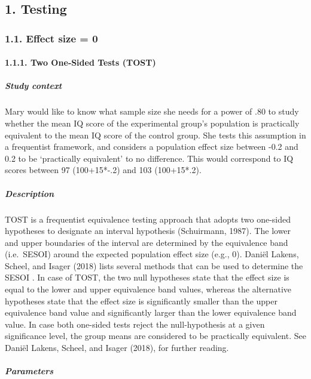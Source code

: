 \documentclass[
  english,
  man,floatsintext]{apa6}
\let\oldparagraph\paragraph
\renewcommand{\paragraph}[1]{\oldparagraph{#1}\mbox{}}
\let\oldsubparagraph\subparagraph
\renewcommand{\subparagraph}[1]{\oldsubparagraph{#1}\mbox{}}
\begin{document}
\hypertarget{testing}{%
\subsection{1. Testing}\label{testing}}

\hypertarget{effect-size-0}{%
\subsubsection{1.1. Effect size = 0}\label{effect-size-0}}

\hypertarget{two-onesided-tests-tost}{%
\paragraph{1.1.1. Two One‐Sided Tests (TOST)}\label{two-onesided-tests-tost}}

\hypertarget{study-context}{%
\subparagraph{Study context}\label{study-context}}

Mary would like to know what sample size she needs for a power of .80 to study whether the mean IQ score of the experimental group's population is practically equivalent to the mean IQ score of the control group. She tests this assumption in a frequentist framework, and considers a population effect size between -0.2 and 0.2 to be `practically equivalent' to no difference. This would correspond to IQ scores between 97 (100+15*-.2) and 103 (100+15*.2).

\hypertarget{description}{%
\subparagraph{Description}\label{description}}

TOST is a frequentist equivalence testing approach that adopts two one-sided hypotheses to designate an interval hypothesis (Schuirmann, 1987). The lower and upper boundaries of the interval are determined by the equivalence band (i.e.~SESOI) around the expected population effect size (e.g., 0). Daniël Lakens, Scheel, and Isager (2018) lists several methods that can be used to determine the SESOI . In case of TOST, the two null hypotheses state that the effect size is equal to the lower and upper equivalence band values, whereas the alternative hypotheses state that the effect size is significantly smaller than the upper equivalence band value and significantly larger than the lower equivalence band value. In case both one-sided tests reject the null-hypothesis at a given significance level, the group means are considered to be practically equivalent. See Daniël Lakens, Scheel, and Isager (2018), for further reading.

\hypertarget{parameters}{%
\subparagraph{Parameters}\label{parameters}}
\end{document}

